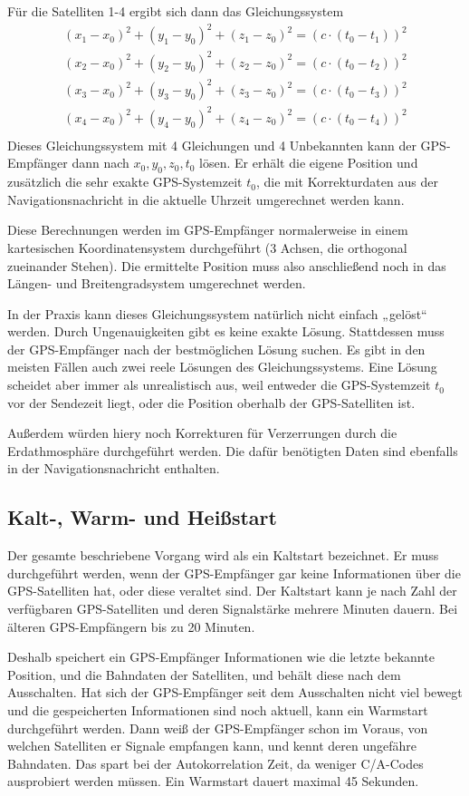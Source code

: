 \documentclass[12pt,a4paper]{scrartcl}
\begin{document}
Für die Satelliten 1-4 ergibt sich dann das Gleichungssystem
\begin{align*}
(x_1 - x_0)^2 + (y_1 - y_0)^2 + (z_1 - z_0)^2 = (c\cdot(t_0-t_1))^2 \\
(x_2 - x_0)^2 + (y_2 - y_0)^2 + (z_2 - z_0)^2 = (c\cdot(t_0-t_2))^2 \\
(x_3 - x_0)^2 + (y_3 - y_0)^2 + (z_3 - z_0)^2 = (c\cdot(t_0-t_3))^2 \\
(x_4 - x_0)^2 + (y_4 - y_0)^2 + (z_4 - z_0)^2 = (c\cdot(t_0-t_4))^2 \\
\end{align*}
Dieses Gleichungssystem mit 4 Gleichungen und 4 Unbekannten kann der GPS-Empfänger dann nach $x_0,y_0,z_0,t_0$ lösen. Er erhält die eigene Position und zusätzlich die sehr exakte GPS-Systemzeit $t_0$, die mit Korrekturdaten aus der Navigationsnachricht in die aktuelle Uhrzeit umgerechnet werden kann.

Diese Berechnungen werden im GPS-Empfänger normalerweise in einem kartesischen Koordinatensystem durchgeführt (3 Achsen, die orthogonal zueinander Stehen). Die ermittelte Position muss also anschließend noch in das Längen- und Breitengradsystem umgerechnet werden.

In der Praxis kann dieses Gleichungssystem natürlich nicht einfach „gelöst“ werden. Durch Ungenauigkeiten gibt es keine exakte Lösung. Stattdessen muss der GPS-Empfänger nach der bestmöglichen Lösung suchen. Es gibt in den meisten Fällen auch zwei reele Lösungen des Gleichungssystems. Eine Lösung scheidet aber immer als unrealistisch aus, weil entweder die GPS-Systemzeit $t_0$ vor der Sendezeit liegt, oder die Position oberhalb der GPS-Satelliten ist.

Außerdem würden hiery noch Korrekturen für Verzerrungen durch die Erdathmosphäre durchgeführt werden. Die dafür benötigten Daten sind ebenfalls in der Navigationsnachricht enthalten.

\subsection{Kalt-, Warm- und Heißstart}
Der gesamte beschriebene Vorgang wird als ein Kaltstart bezeichnet. Er muss durchgeführt werden, wenn der GPS-Empfänger gar keine Informationen über die GPS-Satelliten hat, oder diese veraltet sind. Der Kaltstart kann je nach Zahl der verfügbaren GPS-Satelliten und deren Signalstärke mehrere Minuten dauern. Bei älteren GPS-Empfängern bis zu 20 Minuten.

Deshalb speichert ein GPS-Empfänger Informationen wie die letzte bekannte Position, und die Bahndaten der Satelliten, und behält diese nach dem Ausschalten. Hat sich der GPS-Empfänger seit dem Ausschalten nicht viel bewegt und die gespeicherten Informationen sind noch aktuell, kann ein Warmstart durchgeführt werden. Dann weiß der GPS-Empfänger schon im Voraus, von welchen Satelliten er Signale empfangen kann, und kennt deren ungefähre Bahndaten. Das spart bei der Autokorrelation Zeit, da weniger C/A-Codes ausprobiert werden müssen. Ein Warmstart dauert maximal 45 Sekunden.
\end{document}
